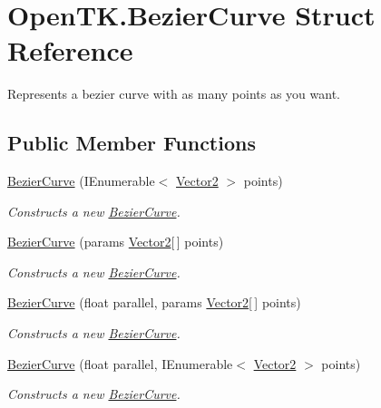 \hypertarget{struct_open_t_k_1_1_bezier_curve}{\section{Open\-T\-K.\-Bezier\-Curve Struct Reference}
\label{struct_open_t_k_1_1_bezier_curve}
}


Represents a bezier curve with as many points as you want.  


\subsection*{Public Member Functions}
\begin{DoxyCompactItemize}
\item 
\hyperlink{struct_open_t_k_1_1_bezier_curve_a9e392c383d9dadf9623ef006448ffcc7}{Bezier\-Curve} (I\-Enumerable$<$ \hyperlink{struct_open_t_k_1_1_vector2}{Vector2} $>$ points)
\begin{DoxyCompactList}\small\item\em Constructs a new \hyperlink{struct_open_t_k_1_1_bezier_curve}{Bezier\-Curve}. \end{DoxyCompactList}\item 
\hyperlink{struct_open_t_k_1_1_bezier_curve_a2b36fa455380baef82dca2391b5a6b5e}{Bezier\-Curve} (params \hyperlink{struct_open_t_k_1_1_vector2}{Vector2}\mbox{[}$\,$\mbox{]} points)
\begin{DoxyCompactList}\small\item\em Constructs a new \hyperlink{struct_open_t_k_1_1_bezier_curve}{Bezier\-Curve}. \end{DoxyCompactList}\item 
\hyperlink{struct_open_t_k_1_1_bezier_curve_a9d2e84ce4f74629ed718a60325c3fb7c}{Bezier\-Curve} (float parallel, params \hyperlink{struct_open_t_k_1_1_vector2}{Vector2}\mbox{[}$\,$\mbox{]} points)
\begin{DoxyCompactList}\small\item\em Constructs a new \hyperlink{struct_open_t_k_1_1_bezier_curve}{Bezier\-Curve}. \end{DoxyCompactList}\item 
\hyperlink{struct_open_t_k_1_1_bezier_curve_a1d48c667b91891dee4d437df35302b6a}{Bezier\-Curve} (float parallel, I\-Enumerable$<$ \hyperlink{struct_open_t_k_1_1_vector2}{Vector2} $>$ points)
\begin{DoxyCompactList}\small\item\em Constructs a new \hyperlink{struct_open_t_k_1_1_bezier_curve}{Bezier\-Curve}. \end{DoxyCompactList}\item 

\end{DoxyCompactItemize}
